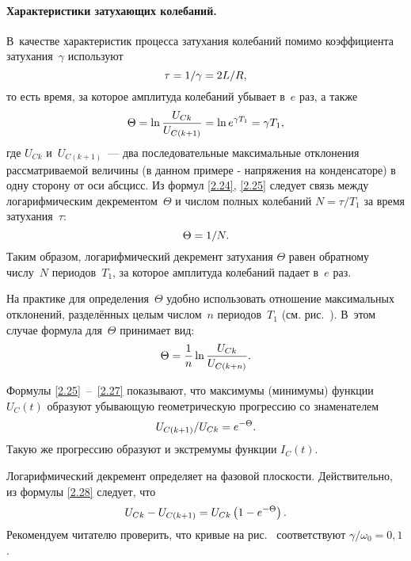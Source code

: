 \paragraph{Характеристики затухающих колебаний.}
В~качестве характеристик процесса затухания колебаний помимо коэффициента
затухания~$\gamma$ используют 
\begin{equation}\eqmark{2.24}
\tau=1/\gamma=2L/R,
\end{equation}
то есть время, за которое амплитуда колебаний убывает в~$e$ раз, а также
\begin{equation}\eqmark{2.25}
\Theta=\ln\dfrac{U_{Ck}}{U_{C(k+1)}}=\ln e^{\gamma T_1}=\gamma T_1,
\end{equation}
где $U_{Ck}$ и~$U_{C(k+1)}$~--- два последовательные максимальные отклонения
рассматриваемой величины (в данном примере - напряжения на конденсаторе) в одну
сторону от оси абсцисс. Из формул \eqref{2.24}, \eqref{2.25} следует связь между
логарифмическим декрементом~$\Theta$ и числом полных колебаний $N=\tau/T_1$ за
время затухания~$\tau$:
\begin{equation}\eqmark{2.26}
\Theta=1/N.
\end{equation}
Таким образом, логарифмический декремент затухания $\Theta$ равен обратному
числу~$N$ периодов~$T_1$, за которое амплитуда колебаний падает в~$e$ раз.

На практике для определения~$\Theta$ удобно использовать отношение максимальных
отклонений, разделённых целым числом~$n$ периодов~$T_1$ (см.
рис.~). В~этом случае формула для~$\Theta$ принимает вид:
\begin{equation}\eqmark{2.27}
\Theta=\dfrac{1}{n}\ln\dfrac{U_{Ck}}{U_{C(k+n)}}.
\end{equation}

Формулы \eqref{2.25}~--~\eqref{2.27} показывают, что максимумы (минимумы)
функции $U_C(t)$ образуют убывающую геометрическую прогрессию со знаменателем
\begin{equation}\eqmark{2.28}
U_{C(k+1)}/U_{Ck}=e^{-\Theta}.
\end{equation}
Такую же прогрессию образуют и экстремумы функции $I_C(t)$.

Логарифмический декремент определяет  на фазовой плоскости. Действительно, из формулы \eqref{2.28} следует,
что
\begin{equation}\eqmark{2.29}
U_{Ck}-U_{C(k+1)}=U_{Ck}\left(1-e^{-\Theta}\right).
\end{equation}
Рекомендуем читателю проверить, что кривые на рис.~ соответствуют
$\gamma/\omega_0=0,1$.

